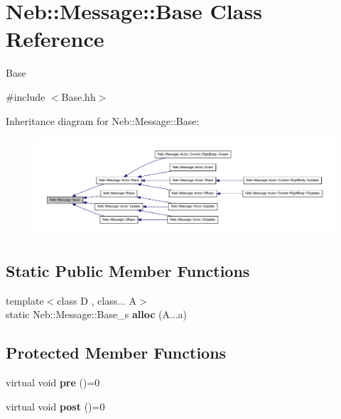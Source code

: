 \hypertarget{classNeb_1_1Message_1_1Base}{\section{\-Neb\-:\-:\-Message\-:\-:\-Base \-Class \-Reference}
\label{classNeb_1_1Message_1_1Base}
}


\-Base  




{\ttfamily \#include $<$\-Base.\-hh$>$}



\-Inheritance diagram for \-Neb\-:\-:\-Message\-:\-:\-Base\-:\nopagebreak
\begin{figure}[H]
\begin{center}
\leavevmode
\includegraphics[width=350pt]{classNeb_1_1Message_1_1Base__inherit__graph}
\end{center}
\end{figure}
\subsection*{\-Static \-Public \-Member \-Functions}
\begin{DoxyCompactItemize}
\item 
\hypertarget{classNeb_1_1Message_1_1Base_ad2336e4055a84d48220650b4ad8b2be9}{{\footnotesize template$<$class D , class... \-A$>$ }\\static \-Neb\-::\-Message\-::\-Base\-\_\-s {\bfseries alloc} (\-A...\-a)}\label{classNeb_1_1Message_1_1Base_ad2336e4055a84d48220650b4ad8b2be9}

\end{DoxyCompactItemize}
\subsection*{\-Protected \-Member \-Functions}
\begin{DoxyCompactItemize}
\item 
\hypertarget{classNeb_1_1Message_1_1Base_a61078b75545c67510d0f5b4952a7752b}{virtual void {\bfseries pre} ()=0}\label{classNeb_1_1Message_1_1Base_a61078b75545c67510d0f5b4952a7752b}

\item 
\hypertarget{classNeb_1_1Message_1_1Base_a198c25aeeb18c9b8491158923003c692}{virtual void {\bfseries post} ()=0}\label{classNeb_1_1Message_1_1Base_a198c25aeeb18c9b8491158923003c692}

\end{DoxyCompactItemize}


